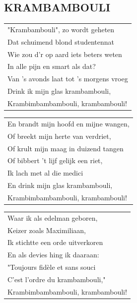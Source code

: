 \documentclass{article}
\begin{document}
\subsection*{KRAMBAMBOULI}
\begin{flushleft}
\begin{tabularx}{0.8\textwidth} {
   >{\raggedright\arraybackslash}X}
   "Krambambouli", zo wordt geheten\\
Dat schuimend blond studentennat\\
Wie zou d’r op aard iets beters weten\\
In alle pijn en smart als dat?\\
Van ’s avonds laat tot ’s morgens vroeg\\
Drink ik mijn glas krambambouli,\\
Krambimbambambouli, krambambouli!\\
\end{tabularx}
\end{flushleft}\begin{flushleft}
\begin{tabularx}{0.8\textwidth} {
   >{\raggedright\arraybackslash}X}
En brandt mijn hoofd en mijne wangen,\\
Of breekt mijn herte van verdriet,\\
Of krult mijn maag in duizend tangen\\
Of bibbert ’t lijf gelijk een riet,\\
Ik lach met al die medici\\
En drink mijn glas krambambouli,\\
Krambimbambambouli, krambambouli!\\
\end{tabularx}
\end{flushleft}\begin{flushleft}
\begin{tabularx}{0.8\textwidth} {
   >{\raggedright\arraybackslash}X}
Waar ik als edelman geboren,\\
Keizer zoals Maximiliaan,\\
Ik stichtte een orde uitverkoren\\
En als devies hing ik daaraan:\\
"Toujours fidèle et sans souci\\
C’est l’ordre du krambambouli,"\\
Krambimbambambouli, krambambouli!\\
\end{tabularx}
\end{flushleft}\begin{flushleft}

\end{flushleft}
\end{document}

